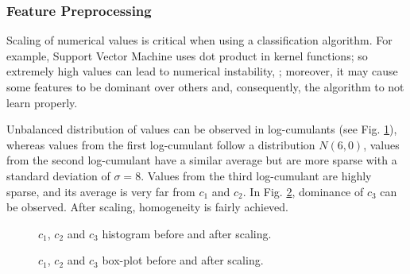 \documentclass{article}
\begin{document}
\subsubsection{Feature Preprocessing}

Scaling of numerical values is critical when using a classification algorithm. For example, Support Vector Machine uses dot product in kernel functions; so extremely high values can lead to numerical instability, \citep{hsu2003practical}; moreover, it may cause some features to be dominant over others and, consequently, the algorithm to not learn properly.

Unbalanced distribution of values can be observed in log-cumulants (see Fig. \ref{cumulants}), whereas values from the first log-cumulant follow a distribution $N(6,0)$, values from the second log-cumulant have a similar average but are more sparse with a standard deviation of $\sigma = 8$. Values from the third log-cumulant are highly sparse, and its average is very far from $c_1$ and $c_2$. In Fig. \ref{boxplot}, dominance of $c_3$ can be observed. After scaling, homogeneity is fairly achieved. 


\begin{figure}[ht]
	\centering
	\caption{$c_1$, $c_2$ and $c_3$ histogram before and after scaling.} \label{cumulants}
\end{figure}
\begin{figure}[ht]
	\centering
	\caption{$c_1$, $c_2$ and $c_3$ box-plot before and after scaling. } \label{boxplot}
\end{figure}
\end{document}
